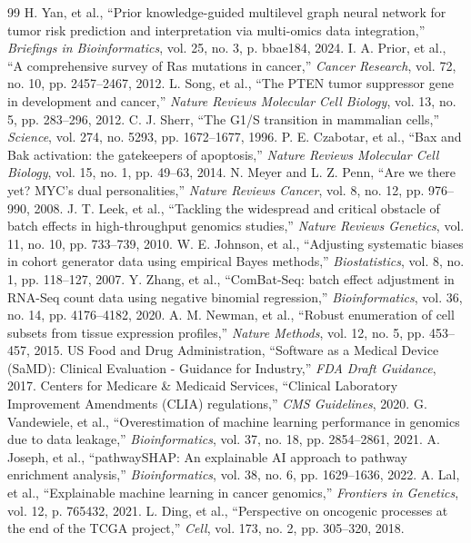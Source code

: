 \documentclass[journal,10pt]{IEEEtran}
\begin{document}
\begin{thebibliography}{99}
 H. Yan, et al., ``Prior knowledge-guided multilevel graph neural network for tumor risk prediction and interpretation via multi-omics data integration,'' \textit{Briefings in Bioinformatics}, vol. 25, no. 3, p. bbae184, 2024.
 I. A. Prior, et al., ``A comprehensive survey of Ras mutations in cancer,'' \textit{Cancer Research}, vol. 72, no. 10, pp. 2457--2467, 2012.
 L. Song, et al., ``The PTEN tumor suppressor gene in development and cancer,'' \textit{Nature Reviews Molecular Cell Biology}, vol. 13, no. 5, pp. 283--296, 2012.
 C. J. Sherr, ``The G1/S transition in mammalian cells,'' \textit{Science}, vol. 274, no. 5293, pp. 1672--1677, 1996.
 P. E. Czabotar, et al., ``Bax and Bak activation: the gatekeepers of apoptosis,'' \textit{Nature Reviews Molecular Cell Biology}, vol. 15, no. 1, pp. 49--63, 2014.
 N. Meyer and L. Z. Penn, ``Are we there yet? MYC's dual personalities,'' \textit{Nature Reviews Cancer}, vol. 8, no. 12, pp. 976--990, 2008.
 J. T. Leek, et al., ``Tackling the widespread and critical obstacle of batch effects in high-throughput genomics studies,'' \textit{Nature Reviews Genetics}, vol. 11, no. 10, pp. 733--739, 2010.
 W. E. Johnson, et al., ``Adjusting systematic biases in cohort generator data using empirical Bayes methods,'' \textit{Biostatistics}, vol. 8, no. 1, pp. 118--127, 2007.
 Y. Zhang, et al., ``ComBat-Seq: batch effect adjustment in RNA-Seq count data using negative binomial regression,'' \textit{Bioinformatics}, vol. 36, no. 14, pp. 4176--4182, 2020.
 A. M. Newman, et al., ``Robust enumeration of cell subsets from tissue expression profiles,'' \textit{Nature Methods}, vol. 12, no. 5, pp. 453--457, 2015.
 US Food and Drug Administration, ``Software as a Medical Device (SaMD): Clinical Evaluation - Guidance for Industry,'' \textit{FDA Draft Guidance}, 2017.
 Centers for Medicare \& Medicaid Services, ``Clinical Laboratory Improvement Amendments (CLIA) regulations,'' \textit{CMS Guidelines}, 2020.
 G. Vandewiele, et al., ``Overestimation of machine learning performance in genomics due to data leakage,'' \textit{Bioinformatics}, vol. 37, no. 18, pp. 2854--2861, 2021.
 A. Joseph, et al., ``pathwaySHAP: An explainable AI approach to pathway enrichment analysis,'' \textit{Bioinformatics}, vol. 38, no. 6, pp. 1629--1636, 2022.
 A. Lal, et al., ``Explainable machine learning in cancer genomics,'' \textit{Frontiers in Genetics}, vol. 12, p. 765432, 2021.
 L. Ding, et al., ``Perspective on oncogenic processes at the end of the TCGA project,'' \textit{Cell}, vol. 173, no. 2, pp. 305--320, 2018.
\end{thebibliography}
\end{document}
